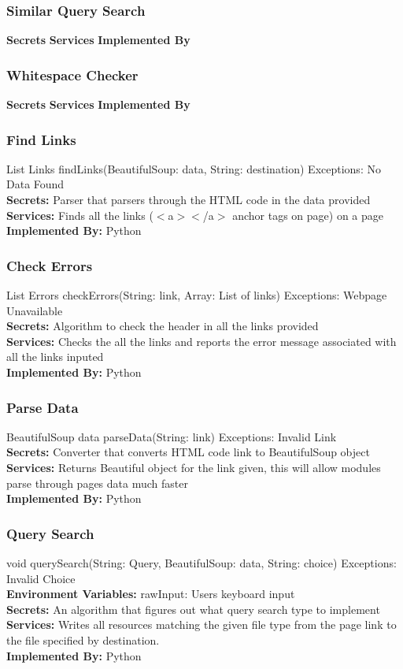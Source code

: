 \documentclass[titlepage]{article}
\begin{document}
\subsubsection{Similar Query Search}
\textbf{Secrets}
\textbf{Services}
\textbf{Implemented By}

\subsubsection{Whitespace Checker}
\textbf{Secrets}
\textbf{Services}
\textbf{Implemented By}

\subsubsection{Find Links}
List Links findLinks(BeautifulSoup: data, String: destination) Exceptions: No Data Found\\
\textbf{Secrets:}
Parser that parsers through the HTML code in the data provided\\
\textbf{Services:}
Finds all the links ($<$a$>$$<$/a$>$ anchor tags on page) on a page \\
\textbf{Implemented By:} Python

\subsubsection{Check Errors}
List Errors checkErrors(String: link, Array: List of links) Exceptions: Webpage Unavailable\\
\textbf{Secrets:}
Algorithm to check the header in all the links provided \\
\textbf{Services:}
Checks the all the links and reports the error message associated with all the links inputed\\
\textbf{Implemented By:} Python

\subsubsection{Parse Data}
BeautifulSoup data parseData(String: link) Exceptions: Invalid Link\\
\textbf{Secrets:}
Converter that converts HTML code link to BeautifulSoup object \\
\textbf{Services:}
Returns Beautiful object for the link given, this will allow modules parse through pages data much faster\\
\textbf{Implemented By:} Python

\subsubsection{Query Search}
void querySearch(String: Query, BeautifulSoup: data, String: choice) Exceptions: Invalid Choice\\
\textbf{Environment Variables:}
rawInput: Users keyboard input\\
\textbf{Secrets:}
An algorithm that figures out what query search type to implement \\
\textbf{Services:}
Writes all resources matching the given file type from the page link to the file specified by destination.\\
\textbf{Implemented By:} Python
\end{document}
